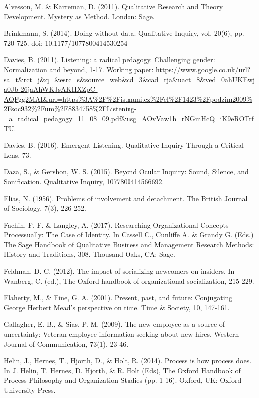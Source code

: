 \label{paper3:references}
\begin{thebibliography}{99}

\item Alvesson, M. \& Kärreman, D. (2011). Qualitative Research and Theory Development. Mystery as Method. London: Sage.
\item Brinkmann, S. (2014). Doing without data. Qualitative Inquiry, vol. 20(6), pp. 720-725. doi: 10.1177/1077800414530254
\item Davies, B. (2011). Listening: a radical pedagogy. Challenging gender: Normalization and beyond, 1-17. Working paper: \url{https://www.google.co.uk/url?sa=t\&rct=j\&q=\&esrc=s\&source=web\&cd=3\&cad=rja\&uact=8\&ved=0ahUKEwja0Jb-26jaAhWKJsAKHXZpC-AQFgg2MAI\&url=https\%3A\%2F\%2Fis.muni.cz\%2Fel\%2F1423\%2Fpodzim2009\%2Fsoc932\%2Fum\%2F8834758\%2FListening-_a_radical_pedagogy_11_08_09.pdf\&usg=AOvVaw1h_rNGmHcQ_iK9eROTrfTU}.
\item Davies, B. (2016). Emergent Listening. Qualitative Inquiry Through a Critical Lens, 73.
\item Daza, S., \& Gershon, W. S. (2015). Beyond Ocular Inquiry: Sound, Silence, and Sonification. Qualitative Inquiry, 1077800414566692.
\item Elias, N. (1956). Problems of involvement and detachment. The British Journal of Sociology, 7(3), 226-252.
\item Fachin, F. F. \& Langley, A. (2017). Researching Organizational Concepts Processually: The Case of Identity. In Cassell C., Cunliffe A. \& Grandy G. (Eds.) The Sage Handbook of Qualitative Business and Management Research Methods: History and Traditions, 308. Thousand Oaks, CA: Sage.
\item Feldman, D. C. (2012). The impact of socializing newcomers on insiders. In Wanberg, C. (ed.), The Oxford handbook of organizational socialization, 215-229.
\item Flaherty, M., \& Fine, G. A. (2001). Present, past, and future: Conjugating George Herbert Mead’s perspective on time. Time \& Society, 10, 147-161.
\item Gallagher, E. B., \& Sias, P. M. (2009). The new employee as a source of uncertainty: Veteran employee information seeking about new hires. Western Journal of Communication, 73(1), 23-46.
\item Helin, J., Hernes, T., Hjorth, D., \& Holt, R. (2014). Process is how process does. In J. Helin, T. Hernes, D. Hjorth, \& R. Holt (Eds), The Oxford Handbook of Process Philosophy and Organization Studies (pp. 1-16). Oxford, UK: Oxford University Press.

\end{thebibliography}
